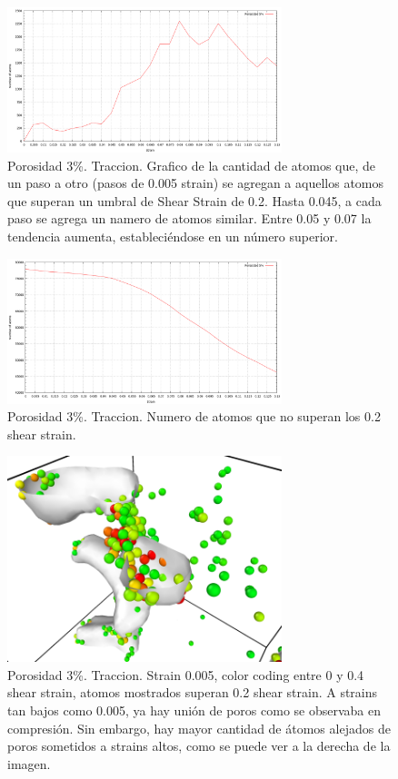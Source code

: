 \documentclass[10pt, oneside]{article} %
\begin{document}
\begin{figure}[H]
\centering
\includegraphics[width=8cm]{Figures/Porosidad/porosidad_trac_umbral.png}
\caption{Porosidad 3\%. Traccion. Grafico de la cantidad de atomos que, de un paso a otro (pasos de 0.005 strain) se agregan a aquellos atomos que superan un umbral de Shear Strain de 0.2. Hasta 0.045, a cada paso se agrega un namero de atomos similar. Entre 0.05 y 0.07 la tendencia aumenta, estableciéndose en un número superior.}
\end{figure}

\begin{figure}[H]
\centering
\includegraphics[width=8cm]{Figures/Porosidad/porosidad_trac_umbral2.png}
\caption{Porosidad 3\%. Traccion. Numero de atomos que no superan los 0.2 shear strain.}
\end{figure}

\begin{figure}[H]
\centering
\includegraphics[width=8cm]{Figures/Porosidad/porosidad_3_strain0005_color_0_04.png}
\caption{Porosidad 3\%. Traccion. Strain 0.005, color coding entre 0 y 0.4 shear strain, atomos mostrados superan 0.2 shear strain. A strains tan bajos como 0.005, ya hay unión de poros como se observaba en compresión. Sin embargo, hay mayor cantidad de átomos alejados de poros sometidos a strains altos, como se puede ver a la derecha de la imagen.}
\end{figure}
\end{document}
